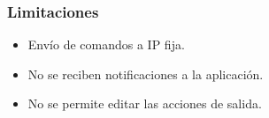 		\subsubsection{Limitaciones}
		
\begin{itemize}
\item Envío de comandos a IP fija.
\item No se reciben notificaciones a la aplicación.
\item No se permite editar las acciones de salida.
\end{itemize}			
	